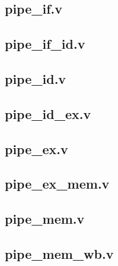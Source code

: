 \documentclass[12pt,a4paper]{article}
\begin{document}
\subsection{pipe\_if.v}
\begingroup
\footnotesize
\linespread{0.8}\selectfont

\endgroup
\clearpage

\subsection{pipe\_if\_id.v}
\begingroup
\footnotesize
\linespread{0.8}\selectfont

\endgroup
\clearpage

\subsection{pipe\_id.v}
\begingroup
\footnotesize
\linespread{0.8}\selectfont

\endgroup
\clearpage

\subsection{pipe\_id\_ex.v}
\begingroup
\footnotesize
\linespread{0.8}\selectfont

\endgroup
\clearpage

\subsection{pipe\_ex.v}
\begingroup
\footnotesize
\linespread{0.8}\selectfont

\endgroup
\clearpage

\subsection{pipe\_ex\_mem.v}
\begingroup
\footnotesize
\linespread{0.8}\selectfont

\endgroup
\clearpage

\subsection{pipe\_mem.v}
\begingroup
\footnotesize
\linespread{0.8}\selectfont

\endgroup
\clearpage

\subsection{pipe\_mem\_wb.v}
\begingroup
\footnotesize
\linespread{0.8}\selectfont

\endgroup
\clearpage
\end{document}
